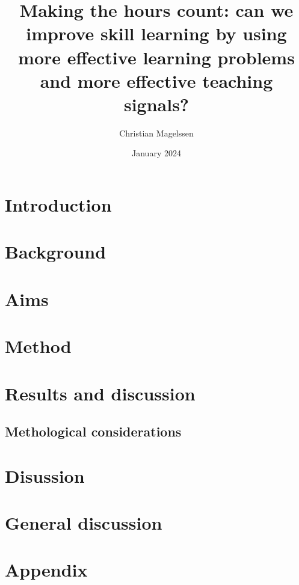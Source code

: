 \documentclass{report}
\title{Making the hours count: can we improve skill learning by using more effective learning problems and more effective teaching signals?}
\author{Christian Magelssen}
\date{January 2024}
\begin{document}
\maketitle

\listoffigures

\chapter{Introduction}


\chapter{Background}


\chapter{Aims}



\chapter{Method}



\chapter{Results and discussion}



\section{Methological considerations}


\chapter{Disussion}




\chapter{General discussion}


\chapter{Appendix}


\printbibliography
\end{document}
